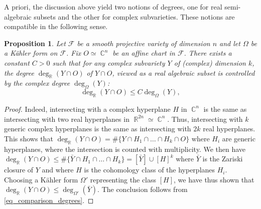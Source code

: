 \documentclass[12pt]{amsbook}%
\newtheorem{prop}[thm]{Proposition}
\theoremstyle{definition}
\theoremstyle{remark}
\numberwithin{section}{chapter}
\numberwithin{subsection}{section}
\numberwithin{figure}{chapter}
\DeclareMathOperator{\C}{\mathbb{C}}
\DeclareMathOperator{\R}{\mathbb{R}}
\def\cF{{\mathscr{F}}}
\begin{document}
{{A priori, the discussion above yield two notions of degrees, one for real semi-algebraic subsets and the other for complex subvarieties. These notions are compatible in the following sense. 

\begin{prop}  \label{prop_degree_real_vs_complex}
Let $\cF$ be a smooth projective variety of dimension $n$ and let $\Omega$ be a K\"ahler form on $\cF$. Fix $O \simeq \C^n $ be an affine chart in $\cF$. 
There exists a constant $C> 0$ such that for 
 any  complex subvariety  $Y$ of (complex) dimension $k$, the  degree $\deg_{\R}(Y\cap O)$ of $Y \cap O$, viewed as a real algebraic subset is controlled by the complex degree $\deg_\Omega(Y)$: 
\begin{equation*}
\deg_{\R} (Y\cap O) \leqslant C \deg_{\Omega}(Y), 
\end{equation*}   
\end{prop}


\begin{proof}
Indeed, intersecting with a complex hyperplane $H$ in $\C^n$ is the same as intersecting with two real hyperplanes in $\R^{2n}\simeq \C^n$. Thus, intersecting with $k$ generic complex hyperplanes is the same as intersecting with $2k$ real hyperplanes. 
 This shows that $\deg_{\R}(Y \cap O) = \# \{ Y \cap H_1 \cap \ldots \cap H_k \cap O \}$ where $H_i$ are generic hyperplanes, where the intersection is counted with multiplicity.  
 We then have $\deg_{\R}(Y \cap O) \leqslant \# \{ \bar Y \cap H_1 \cap \ldots \cap H_k \} = [\bar Y] \cup [H]^k$ where $\bar Y$ is the Zariski closure of $Y$ and where $H$ is the cohomology class of the hyperplanes $H_i$. Choosing a K\"ahler form $\Omega'$ representing the class $[H]$, we have thus shown that $\deg_{\R}(Y\cap O) \leqslant \deg_{\Omega'}(\bar Y)$. The conclusion follows from \eqref{eq_comparison_degrees}. 
\end{proof}

}}
\end{document}
